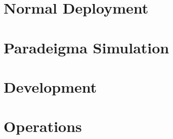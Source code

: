 \documentclass[10pt,a4paper,oneside]{report}
\begin{document}
\part{Normal Deployment}







\part{Paradeigma Simulation}




\part{Development}




\part{Operations}



\appendix
















\end{document}
